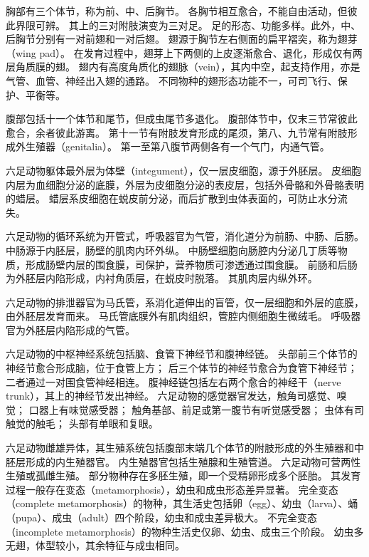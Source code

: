 \documentclass[11pt]{article}
\begin{document}
\newline

胸部有三个体节，称为前、中、后胸节。
各胸节相互愈合，不能自由活动，但彼此界限可辨。
其上的三对附肢演变为三对足。
足的形态、功能多样。此外，中、后胸节分别有一对前翅和一对后翅。
翅源于胸节左右侧面的扁平褶突，称为翅芽（wing pad）。
在发育过程中，翅芽上下两侧的上皮逐渐愈合、退化，形成仅有两层角质膜的翅。
翅内有高度角质化的翅脉（vein），其内中空，起支持作用，亦是气管、血管、神经出入翅的通路。
不同物种的翅形态功能不一，可司飞行、保护、平衡等。

\newline

腹部包括十一个体节和尾节，但成虫尾节多退化。
腹部体节中，仅末三节常彼此愈合，余者彼此游离。
第十一节有附肢发育形成的尾须，第八、九节常有附肢形成外生殖器（genitalia）。
第一至第八腹节两侧各有一个气门，内通气管。

\newline

六足动物躯体最外层为体壁（integument），仅一层皮细胞，源于外胚层。
皮细胞内层为血细胞分泌的底膜，外层为皮细胞分泌的表皮层，包括外骨骼和外骨骼表明的蜡层。
蜡层系皮细胞在蜕皮前分泌，而后扩散到虫体表面的，可防止水分流失。

\newline

六足动物的循环系统为开管式，呼吸器官为气管，消化道分为前肠、中肠、后肠。
中肠源于内胚层，肠壁的肌肉内环外纵。
中肠壁细胞向肠腔内分泌几丁质等物质，形成肠壁内层的围食膜，司保护，营养物质可渗透通过围食膜。
前肠和后肠为外胚层内陷形成，内衬角质层，在蜕皮时脱落。
其肌肉层内纵外环。

\newline

六足动物的排泄器官为马氏管，系消化道伸出的盲管，仅一层细胞和外层的底膜，由外胚层发育而来。
马氏管底膜外有肌肉组织，管腔内侧细胞生微绒毛。
呼吸器官为外胚层内陷形成的气管。

\newline

六足动物的中枢神经系统包括脑、食管下神经节和腹神经链。
头部前三个体节的神经节愈合形成脑，位于食管上方；
后三个体节的神经节愈合为食管下神经节；
二者通过一对围食管神经相连。
腹神经链包括左右两个愈合的神经干（nerve trunk），其上的神经节发出神经。
六足动物的感觉器官发达，触角司感觉、嗅觉；
口器上有味觉感受器；
触角基部、前足或第一腹节有听觉感受器；
虫体有司触觉的触毛；
头部有单眼和复眼。

\newline

六足动物雌雄异体，其生殖系统包括腹部末端几个体节的附肢形成的外生殖器和中胚层形成的内生殖器官。
内生殖器官包括生殖腺和生殖管道。
六足动物可营两性生殖或孤雌生殖。
部分物种存在多胚生殖，即一个受精卵形成多个胚胎。
其发育过程一般存在变态（metamorphosis），幼虫和成虫形态差异显著。
完全变态（complete metamorphosis）的物种，其生活史包括卵（egg）、幼虫（larva）、蛹（pupa）、成虫（adult）四个阶段，幼虫和成虫差异极大。
不完全变态（incomplete metamorphosis）的物种生活史仅卵、幼虫、成虫三个阶段。
幼虫多无翅，体型较小，其余特征与成虫相同。
\end{document}
